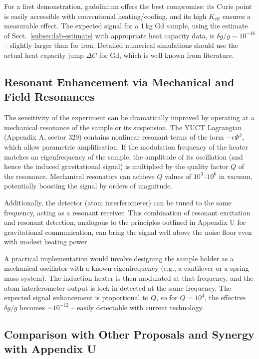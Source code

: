 \documentclass[12pt]{article}
\theoremstyle{remark}
\newcommand{\Keff}{K_{\mathrm{eff}}}
\begin{document}
	For a first demonstration, gadolinium offers the best compromise: its Curie point is easily accessible with conventional heating/cooling, and its high \(\Keff\) ensures a measurable effect. The expected signal for a 1\,kg Gd sample, using the estimate of Sect.~\ref{subsec:lab-estimate} with appropriate heat capacity data, is $\delta g/g \sim 10^{-16}$ -- slightly larger than for iron. Detailed numerical simulations should use the actual heat capacity jump \(\Delta C\) for Gd, which is well known from literature.
	
	\subsection{Resonant Enhancement via Mechanical and Field Resonances}
	\label{subsec:resonant-enhancement}
	
	The sensitivity of the experiment can be dramatically improved by operating at a mechanical resonance of the sample or its suspension. The YUCT Lagrangian (Appendix A, sector 329) contains nonlinear resonant terms of the form \(-\epsilon \Phi^3\), which allow parametric amplification. If the modulation frequency of the heater matches an eigenfrequency of the sample, the amplitude of its oscillation (and hence the induced gravitational signal) is multiplied by the quality factor \(Q\) of the resonance. Mechanical resonators can achieve \(Q\) values of \(10^3\)–\(10^6\) in vacuum, potentially boosting the signal by orders of magnitude.
	
	Additionally, the detector (atom interferometer) can be tuned to the same frequency, acting as a resonant receiver. This combination of resonant excitation and resonant detection, analogous to the principles outlined in Appendix U for gravitational communication, can bring the signal well above the noise floor even with modest heating power.
	
	A practical implementation would involve designing the sample holder as a mechanical oscillator with a known eigenfrequency (e.g., a cantilever or a spring-mass system). The induction heater is then modulated at that frequency, and the atom interferometer output is lock-in detected at the same frequency. The expected signal enhancement is proportional to \(Q\), so for \(Q = 10^4\), the effective \(\delta g/g\) becomes \(\sim 10^{-12}\) – easily detectable with current technology.
	
	\subsection{Comparison with Other Proposals and Synergy with Appendix U}
	\label{subsec:comparison-appU}
	
\end{document}
